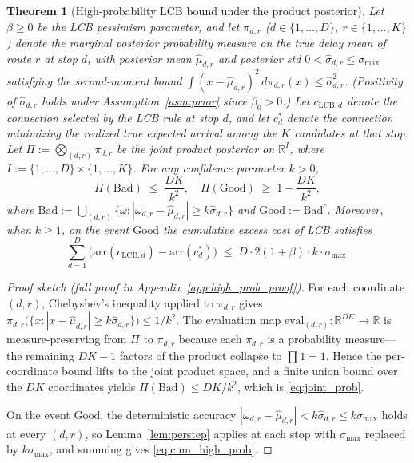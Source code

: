 \documentclass[11pt]{article}
\newtheorem{theorem}{Theorem}
\theoremstyle{definition}
\theoremstyle{remark}
\begin{document}
\begin{theorem}[High-probability LCB bound under the product posterior]\label{thm:lcb_high_prob}
Let $\beta \geq 0$ be the LCB pessimism parameter, and let
$\pi_{d,r}$ ($d \in \{1,\ldots,D\}$, $r \in \{1,\ldots,K\}$) denote
the marginal posterior probability measure on the true delay mean of
route $r$ at stop $d$, with posterior mean $\hat\mu_{d,r}$ and
posterior std $0 < \hat\sigma_{d,r} \leq \sigma_{\max}$ satisfying
the second-moment bound
$\int (x - \hat\mu_{d,r})^2\,d\pi_{d,r}(x) \leq \hat\sigma_{d,r}^2$.
(Positivity of $\hat\sigma_{d,r}$ holds under
Assumption~\ref{asm:prior} since $\beta_0 > 0$.) Let $c_{\mathrm{LCB},d}$
denote the connection selected by the LCB rule at stop $d$, and let
$c^*_d$ denote the connection minimizing the realized true expected
arrival among the $K$ candidates at that stop. Let
$\Pi := \bigotimes_{(d,r)} \pi_{d,r}$ be the joint product posterior
on $\mathbb{R}^{I}$, where $I := \{1,\ldots,D\} \times \{1,\ldots,K\}$.
For any confidence parameter $k > 0$,
\begin{equation}
\Pi(\mathrm{Bad}) \;\leq\; \frac{DK}{k^2},
\quad
\Pi(\mathrm{Good}) \;\geq\; 1 - \frac{DK}{k^2},
\label{eq:joint_prob}
\end{equation}
where
$\mathrm{Bad} := \bigcup_{(d,r)} \{\omega : |\omega_{d,r} - \hat\mu_{d,r}| \geq k\hat\sigma_{d,r}\}$
and $\mathrm{Good} := \mathrm{Bad}^c$. Moreover, when $k \geq 1$, on
the event $\mathrm{Good}$ the cumulative excess cost of LCB satisfies
\begin{equation}
\sum_{d=1}^{D} \bigl(\mathrm{arr}(c_{\mathrm{LCB},d})
- \mathrm{arr}(c^*_d)\bigr)
\;\leq\; D \cdot 2(1+\beta) \cdot k \cdot \sigma_{\max}.
\label{eq:cum_high_prob}
\end{equation}
\end{theorem}

\begin{proof}[Proof sketch (full proof in Appendix~\ref{app:high_prob_proof})]
For each coordinate $(d,r)$, Chebyshev's inequality applied to
$\pi_{d,r}$ gives
$\pi_{d,r}\bigl(\{x : |x - \hat\mu_{d,r}| \geq k\hat\sigma_{d,r}\}\bigr)
\leq 1/k^2$. The evaluation map
$\mathrm{eval}_{(d,r)} : \mathbb{R}^{DK} \to \mathbb{R}$ is
measure-preserving from $\Pi$ to $\pi_{d,r}$ because each $\pi_{d,r}$
is a probability measure---the remaining $DK - 1$ factors of the
product collapse to $\prod 1 = 1$. Hence the per-coordinate bound
lifts to the joint product space, and a finite union bound over the
$DK$ coordinates yields $\Pi(\mathrm{Bad}) \leq DK/k^2$, which is
\eqref{eq:joint_prob}.

On the event $\mathrm{Good}$, the deterministic accuracy
$|\omega_{d,r} - \hat\mu_{d,r}| < k\hat\sigma_{d,r} \leq k\sigma_{\max}$
holds at every $(d,r)$, so Lemma~\ref{lem:perstep} applies at each
stop with $\sigma_{\max}$ replaced by $k\sigma_{\max}$, and summing
gives \eqref{eq:cum_high_prob}.
\end{proof}
\end{document}
